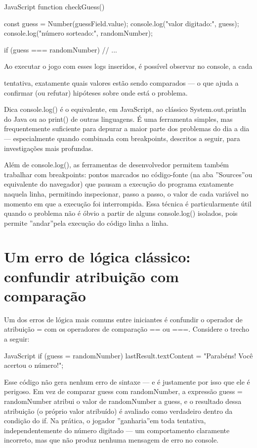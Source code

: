 \begin{codebox}{JavaScript}
 function checkGuess() {
   const guess = Number(guessField.value);
   console.log("valor digitado:", guess);
   console.log("número sorteado:", randomNumber);

     if (guess === randomNumber) {
       // ...
     }
 }

   Ao executar o jogo com esses logs inseridos, é possível observar no console, a cada
\end{codebox}

tentativa, exatamente quais valores estão sendo comparados — o que ajuda a confirmar (ou refutar) hipóteses sobre onde está o problema.

\begin{infobox}{Dica}
console.log() é o equivalente, em JavaScript, ao clássico System.out.println do Java ou ao print() de outras linguagens. É uma ferramenta simples, mas frequentemente suficiente para depurar a maior parte dos problemas do dia a dia — especialmente quando combinada com breakpoints, descritos a seguir, para investigações mais profundas.
\end{infobox}

Além de console.log(), as ferramentas de desenvolvedor permitem também trabalhar com breakpoints: pontos marcados no código-fonte (na aba ”Sources”ou equivalente do navegador) que pausam a execução do programa exatamente naquela linha, permitindo inspecionar, passo a passo, o valor de cada variável no momento em que a execução foi interrompida. Essa técnica é particularmente útil quando o problema não é óbvio a partir de alguns console.log() isolados, pois permite ”andar”pela execução do código linha a linha.

\section{Um erro de lógica clássico: confundir atribuição com comparação}

Um dos erros de lógica mais comuns entre iniciantes é confundir o operador de atribuição = com os operadores de comparação == ou ===. Considere o trecho a seguir:

\begin{codebox}{JavaScript}
 if (guess = randomNumber) {
   lastResult.textContent = "Parabéns! Você acertou o número!";
 }
\end{codebox}

Esse código não gera nenhum erro de sintaxe — e é justamente por isso que ele é perigoso. Em vez de comparar guess com randomNumber, a expressão guess = randomNumber atribui o valor de randomNumber a guess, e o resultado dessa atribuição (o próprio valor atribuído) é avaliado como verdadeiro dentro da condição do if. Na prática, o jogador ”ganharia”em toda tentativa, independentemente do número digitado — um comportamento claramente incorreto, mas que não produz nenhuma mensagem de erro no console.

